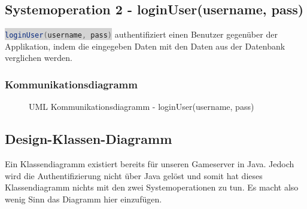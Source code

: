 \documentclass[11pt,ngerman]{article}
\newcommand{\inlinecode}[2]{\colorbox{lightgray}{\lstinline[language=#1]$#2$}}
\begin{document}
     \subsection{Systemoperation 2 - loginUser(username, pass)}
     \inlinecode{Java}{loginUser(username, pass)} authentifiziert einen Benutzer gegenüber der Applikation, indem die eingegeben Daten mit den Daten aus der Datenbank verglichen werden.

         \subsubsection{Kommunikationsdiagramm}
          \begin{figure}[H]
             \centering
             \caption{UML Kommunikationsdiagramm - loginUser(username, pass)}
             \label{fig:UMLKommunikationsdiagramm_loginUser}
         \end{figure}

     \subsection{Design-Klassen-Diagramm}
     Ein Klassendiagramm existiert bereits für unseren Gameserver in Java. Jedoch wird die Authentifizierung nicht über Java gelöst und somit hat dieses Klassendiagramm nichts mit den zwei Systemoperationen zu tun. Es macht also wenig Sinn das Diagramm hier einzufügen.
\end{document}
